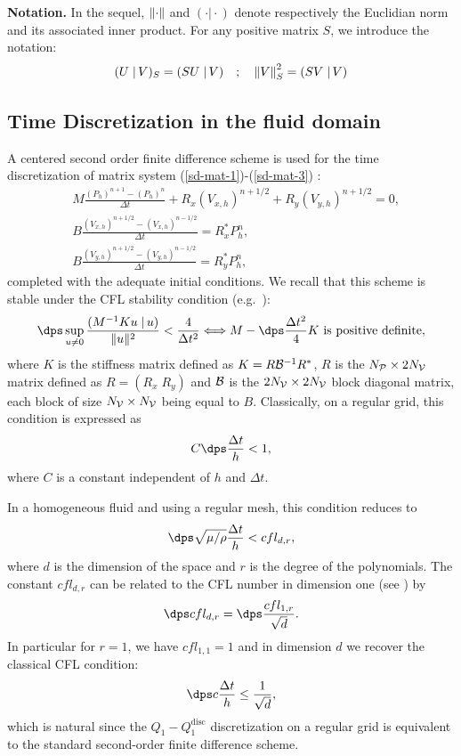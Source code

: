 \documentclass[a4paper]{article}
\def\disc{\mathrm{disc}}
\begin{document}
{\bf Notation.} In the sequel, $\left\|\cdot\right\|$ and $(\cdot\left.\right|\cdot)$  
denote respectively the Euclidian norm and its associated inner product. 
For any positive matrix $S$, we introduce the notation:
$$
(U \left.\right|V)_S = (S U \left.\right| V) 
\quad ; \quad 
\left\|V\right\|_S^2= (S V \left. \right|  V) 
$$

\subsection{Time Discretization in the fluid domain}
A centered second order finite difference scheme is used for the 
time discretization of matrix system (\ref{sd-mat-1})-(\ref{sd-mat-3}) :
\begin{align*}
  & M \frac{(P_{h})^{n+1}-(P_{h})^{n}}{\Delta t} +
 R_{x}(V_{x,h})^{n+1/2}+R_{y}(V_{y,h})^{n+1/2}=0 ,\\[12pt]
  &   B \frac{(V_{x,h})^{n+1/2}- (V_{x,h})^{n-1/2}}{\Delta t} 
    =R_{x}^{*}P_{h}^{n}, \\[12pt]
  &   B  \frac{(V_{y,h})^{n+1/2}- (V_{y,h})^{n-1/2}}{\Delta t} 
  =R_{y}^{*}P_{h}^n,
\end{align*}
completed with the adequate initial conditions. We recall that this 
scheme is stable under the CFL stability condition (e.g.~\cite{fauqueux,cohen-fauq:00}):
\begin{equation*}
\dps \sup_{u\ne 0} \frac{(M^{-1} Ku   \left. \right|  u)}{    \|    u\|^2} <
\frac{4}{\Delta t^2} \Longleftrightarrow M- \dps \frac{\Delta t^2}{4} K 
\mbox{ is positive definite},
\end{equation*}
where  $K$ is the stiffness matrix defined as $K= R{\cal B}^{-1} R^{*}$,
$R$ is the $N_{\cal P} \times 2 N_{\cal V}$  matrix defined as $R= (R_x \; R_y)$ 
and ${\cal B}$ is the $2N_{\cal V} \times 2 N_{\cal V}$ block diagonal 
matrix, each block of size $ N_{\cal V} \times N_{\cal V}$ being equal 
to $B$. Classically, on a regular grid, this condition is expressed as 
\begin{equation}
\label{eq:cfl-fluid-clas}
C\dps \frac{\Delta t}{h} <1,
\end{equation}
where $C$ is a constant independent of $h$ and $\Delta t$.

In a homogeneous fluid and using a regular mesh, this condition reduces to
\begin{equation*}
\dps \sqrt{\mu/\rho} \frac{\Delta t}{h} < cfl_{d,r} , 
\end{equation*}
where $d$ is the dimension of the space and $r$ is the degree of the
polynomials. The constant $cfl_{d,r}$ can be related to the CFL number 
in dimension one (see \cite{fauqueux}) by 
\begin{equation}
\label{eq:cfl-fluid-3}
\dps  cfl_{d,r}= \dps \frac{cfl_{1,r}}{\sqrt{d}} .
\end{equation}
In particular for $r=1$, we have $cfl_{1,1}=1$ and in dimension $d$ 
we recover the classical CFL condition:
\begin{equation*}
\dps c \frac{\Delta t}{h} \le \frac{1}{\sqrt{d}},
\end{equation*}
which is natural since the $Q_1 - Q_1^{\disc}$ discretization on a regular 
grid is equivalent to the standard second-order finite difference scheme.
\end{document}
